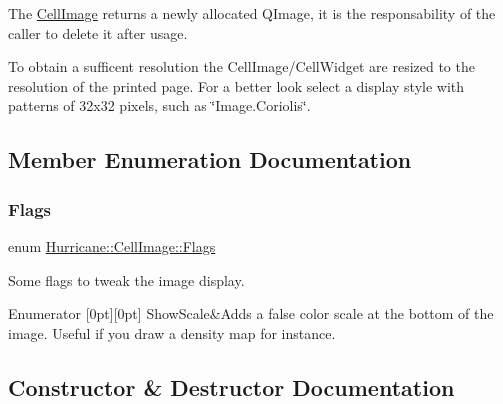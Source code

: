 The \hyperlink{classHurricane_1_1CellImage}{Cell\+Image} returns a newly allocated Q\+Image, it is the responsability of the caller to delete it after usage.

To obtain a sufficent resolution the Cell\+Image/\+Cell\+Widget are resized to the resolution of the printed page. For a better look select a display style with patterns of 32x32 pixels, such as {\ttfamily \char`\"{}\+Image.\+Coriolis\char`\"{}}. 

\subsection{Member Enumeration Documentation}
\mbox{\label{classHurricane_1_1CellImage_a5836ca863f8bc47702ca040ac8897703}} 
\subsubsection{\texorpdfstring{Flags}{Flags}}
{\footnotesize\ttfamily enum \hyperlink{classHurricane_1_1CellImage_a5836ca863f8bc47702ca040ac8897703}{Hurricane\+::\+Cell\+Image\+::\+Flags}}

Some flags to tweak the image display. \begin{DoxyEnumFields}{Enumerator}
[0pt][0pt]{}\mbox{\label{classHurricane_1_1CellImage_a5836ca863f8bc47702ca040ac8897703a5463e21b19fa7d390bfe239121195879}} 
Show\+Scale&Adds a false color scale at the bottom of the image. Useful if you draw a density map for instance. \\
\hline

\end{DoxyEnumFields}


\subsection{Constructor \& Destructor Documentation}
\mbox{\label{classHurricane_1_1CellImage_a3f73f1a3a90d4625a5e0b31711affc34}} 
